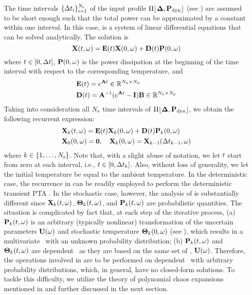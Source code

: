The time intervals $\{ \Delta t_i \}_{i = 1}^{N_\text{s}}$ of the input profile $\profPdyn$ (see ) are assumed to be short enough such that the total power can be approximated by a constant within one interval. In this case,  is a system of linear differential equations that can be solved analytically. The solution is
\begin{equation} \elabel{ode-solution}
  \vX(\t, \o) = \mE(\t) \vX(0, \o) + \mD(\t) \vP(0, \o)
\end{equation}
where $t \in [0, \Delta t]$, $\mathbf{P}(0, \omega)$ is the power dissipation at the beginning of the time interval with respect to the corresponding temperature, and
\begin{align*}
  & \mE(\t) = e^{\mA \t} \in \real^{\nodes \times \nodes} \\
  & \mD(\t) = \mA^{-1} (e^{\mA \t} - \mI) \mB \in \real^{\nodes \times \cores}
\end{align*}
Taking into consideration all $N_\text{s}$ time intervals of $\profPdyn$, we obtain the following recurrent expression:
\begin{align}
  & \vX_k(\t, \o) = \mE(\t) \vX_k(0, \o) + \mD(\t) \vP_k(0, \o) \elabel{recurrence} \\
  & \vX_0(0, \o) = \vZero, \hspace{1em} \vX_k(0, \o) = \vX_{k - 1}(\dt_{k - 1}, \o) \nonumber
\end{align}
where $k \in \{ 1, \dotsc, N_\text{s} \}$. Note that, with a slight abuse of notation, we let $t$ start from zero at each interval, i.e., $t \in [ 0, \Delta t_k ]$. Also, without loss of generality, we let the initial temperature be equal to the ambient temperature. In the deterministic case, the recurrence in  can be readily employed to perform the deterministic transient PTA \cite{thiele2011, ukhov2012}. In the stochastic case, however, the analysis of  is substantially different since $\mathbf{X}_k(t, \omega)$, ${\boldsymbol\Theta}_k(t, \omega)$, and $\mathbf{P}_k(t, \omega)$ are probabilistic quantities. The situation is complicated by fact that, at each step of the iterative process, (a) $\mathbf{P}_k(t, \omega)$ is an arbitrary (typically nonlinear) transformation of the uncertain parameters $\mathbf{U}(\omega)$ and stochastic temperature ${\boldsymbol\Theta}_k(0, \omega)$ (see ), which results in a multivariate \rv\ with an unknown probability distribution; (b) $\mathbf{P}_k(t, \omega)$ and ${\boldsymbol\Theta}_k(t, \omega)$ are dependent \rvs\ as they are based on the same set of \rvs, $\mathbf{U}(\omega)$. Therefore, the operations involved in  are to be performed on dependent \rvs\ with arbitrary probability distributions, which, in general, have no closed-form solutions. To tackle this difficulty, we utilize the theory of polynomial chaos expansions mentioned in  and further discussed in the next section.
